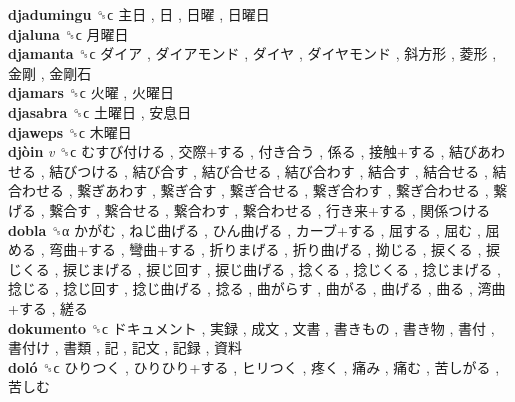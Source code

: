 \textbf{djadumingu} ␝ϲ   主日 ,  日 ,  日曜 ,  日曜日   \\
\textbf{djaluna} ␝ϲ   月曜日   \\
\textbf{djamanta} ␝ϲ   ダイア ,  ダイアモンド ,  ダイヤ ,  ダイヤモンド ,  斜方形 ,  菱形 ,  金剛 ,  金剛石   \\
\textbf{djamars} ␝ϲ   火曜 ,  火曜日   \\
\textbf{djasabra} ␝ϲ   土曜日 ,  安息日   \\
\textbf{djaweps} ␝ϲ   木曜日   \\
\textbf{djòin} \emph{v}  ␝ϲ   むすび付ける ,  交際+する ,  付き合う ,  係る ,  接触+する ,  結びあわせる ,  結びつける ,  結び合す ,  結び合せる ,  結び合わす ,  結合す ,  結合せる ,  結合わせる ,  繋ぎあわす ,  繋ぎ合す ,  繋ぎ合せる ,  繋ぎ合わす ,  繋ぎ合わせる ,  繋げる ,  繋合す ,  繋合せる ,  繋合わす ,  繋合わせる ,  行き来+する ,  関係つける   \\
\textbf{dobla} ␝α   かがむ ,  ねじ曲げる ,  ひん曲げる ,  カーブ+する ,  屈する ,  屈む ,  屈める ,  弯曲+する ,  彎曲+する ,  折りまげる ,  折り曲げる ,  拗じる ,  捩くる ,  捩じくる ,  捩じまげる ,  捩じ回す ,  捩じ曲げる ,  捻くる ,  捻じくる ,  捻じまげる ,  捻じる ,  捻じ回す ,  捻じ曲げる ,  捻る ,  曲がらす ,  曲がる ,  曲げる ,  曲る ,  湾曲+する ,  縒る   \\
\textbf{dokumento} ␝ϲ   ドキュメント ,  実録 ,  成文 ,  文書 ,  書きもの ,  書き物 ,  書付 ,  書付け ,  書類 ,  記 ,  記文 ,  記録 ,  資料   \\
\textbf{doló} ␝ϲ   ひりつく ,  ひりひり+する ,  ヒリつく ,  疼く ,  痛み ,  痛む ,  苦しがる ,  苦しむ   \\
